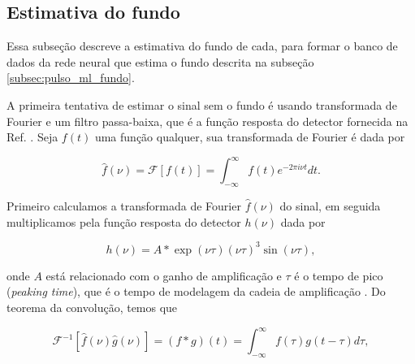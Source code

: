 \documentclass[a4paper,12pt,oneside]{book}
\DeclareMathOperator{\sinc}{sinc}
\begin{document}

\subsection{Estimativa do fundo}\label{subsec:pulses_baseline}

\par Essa subseção descreve a estimativa do fundo de cada, para formar o banco de dados da rede neural que estima o fundo descrita na subseção \ref{subsec:pulso_ml_fundo}.

\par A primeira tentativa de estimar o sinal sem o fundo é usando transformada de Fourier e um filtro passa-baixa, que é a função resposta do detector fornecida na Ref. \cite{GET}. Seja $f(t)$ uma função qualquer, sua transformada de Fourier é dada por

\begin{equation} \label{eq:fourier}
    \hat{f}(\nu)=\mathscr{F}[f(t)]=\int_{-\infty}^{\infty} f(t) e^{-2 \pi i \nu t} d t.
\end{equation}

\par Primeiro calculamos a transformada de Fourier $\hat{f}(\nu)$ do sinal, em seguida multiplicamos pela função resposta do detector $h(\nu)$ dada por \cite{GET}

\begin{equation}
    h(\nu) = A*\exp\left (\nu \tau \right)\left(\nu \tau\right)^3 \sin \left( \nu \tau \right) ,
\end{equation}


\par onde $A$ está relacionado com o ganho de amplificação e $\tau$ é o tempo de pico (\textit{peaking time}), que é o tempo de modelagem da cadeia de amplificação \cite{GET}. Do teorema da convolução, temos que \cite{metodos_mat_aplicada}


\begin{equation}
    \mathscr{F}^{-1}[\hat{f}(\nu) \hat{g}(\nu)]=(f * g)(t)=\int_{-\infty}^{\infty} f(\tau) g(t-\tau) d \tau, 
\end{equation}
\end{document}

